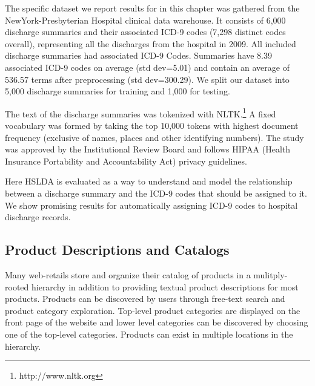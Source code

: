 The specific dataset we report results for in this chapter was gathered from the NewYork-Presbyterian Hospital clinical data warehouse. 
It consists of 6,000 discharge summaries and
their associated ICD-9 codes (7,298 distinct codes overall), representing all
the discharges from the hospital in 2009. All included discharge summaries had associated ICD-9 Codes.
Summaries have 8.39 associated ICD-9
codes on average (std dev=5.01) and contain an average of 536.57 terms after
preprocessing (std dev=300.29). We split our dataset into 5,000 discharge
summaries for training and 1,000 for testing.

The text of the discharge summaries was tokenized with
NLTK.\footnote{http://www.nltk.org} A fixed vocabulary was formed by taking
the top 10,000 tokens with highest document frequency (exclusive of names,
places and other identifying numbers). The study was approved
by the Institutional Review Board and follows HIPAA (Health
Insurance Portability and Accountability Act) privacy guidelines.

Here HSLDA is evaluated as a way to understand and model the relationship between a discharge summary and the ICD-9 codes that should be assigned to it.  We show promising results for automatically assigning ICD-9 codes to hospital discharge records.  


\subsection{Product Descriptions and Catalogs}

Many web-retails store and organize their catalog of products in a
mulitply-rooted hierarchy in addition to providing textual product descriptions 
for most products. Products can be discovered by users
through free-text search and product category exploration. Top-level
product categories are displayed on the front page of the website and lower
level categories can be discovered by choosing one of the top-level categories.
Products can exist in multiple locations in the hierarchy.


